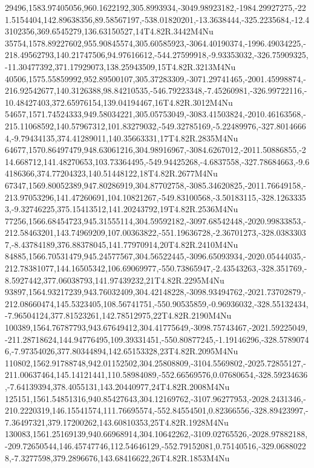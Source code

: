 29496,1583.97405056,960.1622192,305.8993934,-3049.98923182,-1984.29927275,-221.5154404,142.89638356,89.58567197,-538.01820201,-13.3638444,-325.2235684,-12.43102356,369.6545279,136.63150527,14T4.82R.3442M4Nu
35754,1578.89227602,955.90845574,305.60585923,-3064.40190374,-1996.49034225,-218.49562793,140.21747506,94.97616612,-544.27599918,-9.93353032,-326.75909325,-11.30477392,371.17929073,138.25943509,15T4.82R.3213M4Nu
40506,1575.55859992,952.89500107,305.37283309,-3071.29741465,-2001.45998874,-216.92542677,140.3126388,98.84210535,-546.79223348,-7.45260981,-326.99722116,-10.48427403,372.65976154,139.04194467,16T4.82R.3012M4Nu
54657,1571.74524333,949.58034221,305.05753049,-3083.41503824,-2010.46163568,-215.11068592,140.57967312,101.83279032,-549.32785169,-5.22489976,-327.80146664,-9.79434135,374.41289011,140.35663331,17T4.82R.2835M4Nu
64677,1570.86497479,948.63061216,304.98916967,-3084.6267012,-2011.50886855,-214.668712,141.48270653,103.73364495,-549.94425268,-4.6837558,-327.78684663,-9.64186366,374.77204323,140.51448122,18T4.82R.2677M4Nu
67347,1569.80052389,947.80286919,304.87702758,-3085.34620825,-2011.76649158,-213.97053296,141.47260691,104.10821267,-549.83100568,-3.50183115,-328.12633353,-9.32746225,375.15413512,141.20243792,19T4.82R.2536M4Nu
77256,1566.68454723,945.31555114,304.59592182,-3097.68542448,-2020.99833853,-212.58463201,143.74969209,107.00363822,-551.19636728,-2.36701273,-328.03833037,-8.43784189,376.88378045,141.77970914,20T4.82R.2410M4Nu
84885,1566.70531479,945.24577567,304.56522445,-3096.65093934,-2020.05444035,-212.78381077,144.16505342,106.69069977,-550.73865947,-2.43543263,-328.351769,-8.5927442,377.06038793,141.97439232,21T4.82R.2295M4Nu
93897,1564.93217239,943.76032409,304.42148228,-3098.93494762,-2021.73702879,-212.08660474,145.5323405,108.56741751,-550.90535859,-0.96936032,-328.55132434,-7.96504124,377.81523261,142.78512975,22T4.82R.2190M4Nu
100389,1564.76787793,943.67649412,304.41775649,-3098.75743467,-2021.59225049,-211.28718624,144.94776495,109.39331451,-550.80877245,-1.19146296,-328.57890746,-7.97354026,377.80344894,142.65153328,23T4.82R.2095M4Nu
110802,1562.91788748,942.01152502,304.25808809,-3104.5569802,-2025.72855127,-211.00637464,145.14121441,110.58984089,-552.66569576,0.07680654,-328.59234636,-7.64139394,378.4055131,143.20440977,24T4.82R.2008M4Nu
125151,1561.54851316,940.85427643,304.12169762,-3107.96277953,-2028.2431346,-210.2220319,146.15541574,111.76695574,-552.84554501,0.82366556,-328.89423997,-7.36497321,379.17200262,143.60810353,25T4.82R.1928M4Nu
130083,1561.25169139,940.66968914,304.10642262,-3109.02765526,-2028.97882188,-209.72650544,146.45747746,112.54646129,-552.79152081,0.75140516,-329.06880228,-7.3277598,379.2896676,143.68416622,26T4.82R.1853M4Nu
